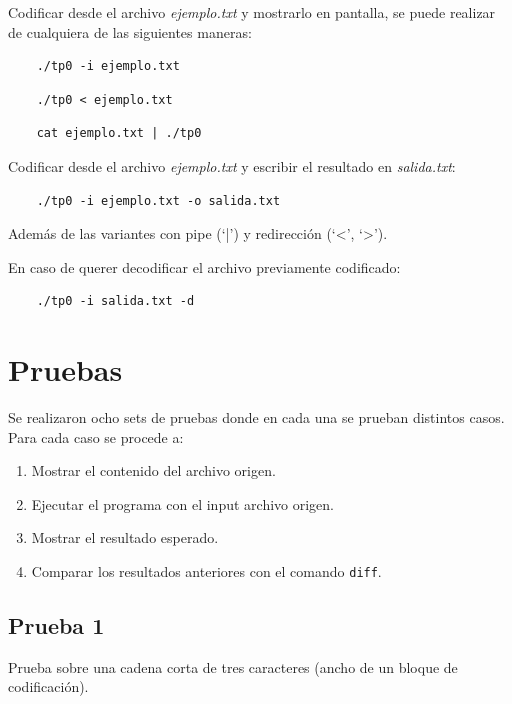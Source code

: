 \documentclass[titlepage,a4paper]{article}
\begin{document}
Codificar desde el archivo \textit{ejemplo.txt} y mostrarlo en pantalla, se puede realizar de cualquiera de las siguientes maneras:

\begin{verbatim}
    ./tp0 -i ejemplo.txt
\end{verbatim}

\begin{verbatim}
    ./tp0 < ejemplo.txt
\end{verbatim}

\begin{verbatim}
    cat ejemplo.txt | ./tp0
\end{verbatim}

Codificar desde  el archivo \textit{ejemplo.txt} y escribir el resultado en \textit{salida.txt}:

\begin{verbatim}
    ./tp0 -i ejemplo.txt -o salida.txt
\end{verbatim}

Además de las variantes con pipe (`|') y redirección (`<', `>').

En caso de querer decodificar el archivo previamente codificado:
\begin{verbatim}
    ./tp0 -i salida.txt -d
\end{verbatim}

\section{Pruebas}
Se realizaron ocho sets de pruebas donde en cada una se prueban distintos casos. Para cada caso se procede a:
\begin{enumerate}
    \item Mostrar el contenido del archivo origen.
    \item Ejecutar el programa con el input archivo origen.
    \item Mostrar el resultado esperado.
    \item Comparar los resultados anteriores con el comando \verb|diff|.
\end{enumerate}
\subsection{Prueba 1}
Prueba sobre una cadena corta de tres caracteres (ancho de un bloque de codificación).
\end{document}
